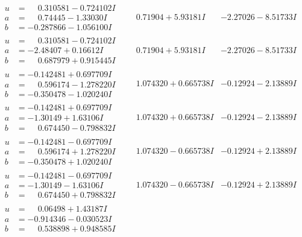 \documentclass[1p]{elsarticle_modified}
\theoremstyle{definition}
\begin{document}
$$\begin{array}{c|c|c}
\begin{aligned}
u &= \phantom{-}0.310581 - 0.724102 I \\
a &= \phantom{-}0.74445 - 1.33030 I \\
b &= -0.287866 - 1.056100 I\end{aligned}
 & \phantom{-}0.71904 + 5.93181 I & -2.27026 - 8.51733 I \\ \hline\begin{aligned}
u &= \phantom{-}0.310581 - 0.724102 I \\
a &= -2.48407 + 0.16612 I \\
b &= \phantom{-}0.687979 + 0.915445 I\end{aligned}
 & \phantom{-}0.71904 + 5.93181 I & -2.27026 - 8.51733 I \\ \hline\begin{aligned}
u &= -0.142481 + 0.697709 I \\
a &= \phantom{-}0.596174 - 1.278220 I \\
b &= -0.350478 - 1.020240 I\end{aligned}
 & \phantom{-}1.074320 + 0.665738 I & -0.12924 - 2.13889 I \\ \hline\begin{aligned}
u &= -0.142481 + 0.697709 I \\
a &= -1.30149 + 1.63106 I \\
b &= \phantom{-}0.674450 - 0.798832 I\end{aligned}
 & \phantom{-}1.074320 + 0.665738 I & -0.12924 - 2.13889 I \\ \hline\begin{aligned}
u &= -0.142481 - 0.697709 I \\
a &= \phantom{-}0.596174 + 1.278220 I \\
b &= -0.350478 + 1.020240 I\end{aligned}
 & \phantom{-}1.074320 - 0.665738 I & -0.12924 + 2.13889 I \\ \hline\begin{aligned}
u &= -0.142481 - 0.697709 I \\
a &= -1.30149 - 1.63106 I \\
b &= \phantom{-}0.674450 + 0.798832 I\end{aligned}
 & \phantom{-}1.074320 - 0.665738 I & -0.12924 + 2.13889 I \\ \hline\begin{aligned}
u &= \phantom{-}0.06498 + 1.43187 I \\
a &= -0.914346 - 0.030523 I \\
b &= \phantom{-}0.538898 + 0.948585 I\end{aligned}

\end{array}$$
\end{document}
